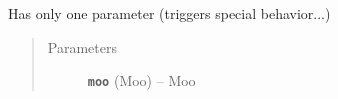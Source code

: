 \documentclass[letterpaper,10pt,english]{sphinxmanual}
\begin{document}

\begin{fulllineitems}
\label{objects:func_without_module2}
\end{fulllineitems}



\begin{fulllineitems}
\end{fulllineitems}


\begin{fulllineitems}
\label{objects:TimeInt}
Has only one parameter (triggers special behavior...)
\begin{quote}\begin{description}
\item[{Parameters}] \leavevmode
\textbf{\texttt{moo}} (Moo) -- Moo

\end{description}\end{quote}

\end{fulllineitems}

\end{document}
